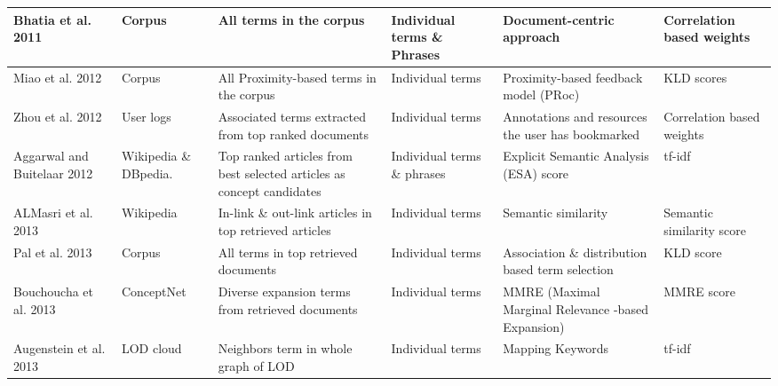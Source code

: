 \begin{landscape}
\begin{table}
{\begin{tabular}{ | M{3cm} | M{3cm} | M{3.2cm} | M{3cm} | M{3cm} | M{3cm} |}
				Bhatia et al. 2011 \cite{bhatia2011query} & Corpus & All terms in the corpus  & Individual terms \& Phrases & Document-centric approach & Correlation based weights \\ \hline
				Miao et al. 2012 \cite{miao2012proximity} & Corpus & All Proximity-based terms in the corpus   & Individual terms & Proximity-based feedback model (PRoc) & KLD scores \\ \hline
				Zhou et al. 2012 \cite{zhou2012improving} & User logs & Associated terms extracted from top ranked documents  & Individual terms & Annotations and resources the user has bookmarked & Correlation based weights \\ \hline
			    Aggarwal and Buitelaar 2012	\cite{aggarwal2012query} & Wikipedia \& DBpedia. & Top ranked articles from best selected articles as concept candidates  & Individual terms \& phrases & Explicit Semantic Analysis (ESA) score & tf-idf  \\ \hline
				ALMasri et al. 2013 \cite{almasri2013wikipedia} & Wikipedia  & In-link \& out-link articles in top retrieved articles & Individual terms & Semantic similarity & Semantic similarity score \\ \hline
				Pal et al. 2013 \cite{pal2013query} & Corpus  & All terms in top retrieved documents  & Individual terms  & Association \& distribution based term selection & KLD score \\ \hline
				Bouchoucha et al. 2013 \cite{bouchoucha2013diversified} & ConceptNet  & Diverse expansion terms from retrieved documents  & Individual terms &  MMRE (Maximal Marginal Relevance -based Expansion) & MMRE score \\ \hline
				Augenstein et al. 2013 \cite{augenstein2013mapping} & LOD cloud & Neighbors term in whole graph of LOD   &  Individual terms & Mapping Keywords & tf-idf\\ \hline
				
				
			\end{tabular}
		}
	\end{table}
\end{landscape}

